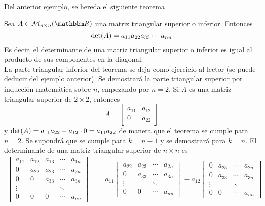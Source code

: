 Del anterior ejemplo, se hereda el siguiente teorema
\begin{theorem}\label{determinante_triangular}
    Sea $A \in \mathcal{M}_{n \times n}(\RR)$ una matriz triangular superior o inferior. Entonces
    $$\operatorname{det}(A) = a_{11}a_{22}a_{33} \cdots a_{nn}$$
    Es decir, el determinante de una matriz triangular superior o inferior es igual al producto de sus componentes en la diagonal.\\
    \demostracion La parte triangular inferior del teorema se deja como ejercicio al lector (se puede deducir del ejemplo anterior). Se demostrará la parte triangular superior por inducción matemática sobre $n$, empezando por $n = 2$. Si $A$ es una matriz triangular superior de $2 \times 2$, entonces
    $$A = \begin{bmatrix}
        a_{11} & a_{12} \\
        0 & a_{22}
    \end{bmatrix}$$
    y $\operatorname{det}(A) = a_{11} a_{22} - a_{12} \cdot 0 = a_{11}a_{22}$ de manera que el teorema se cumple para $n = 2$. Se supondrá que se cumple para $k = n-1$ y se demostrará para $k = n$. El determinante de una matriz triangular superior de $n \times n$ es
    \begin{align*}
        \begin{vmatrix}
            a_{11} & a_{12} & a_{13} & \cdots & a_{1n} \\
            0 & a_{22} & a_{23} & \cdots & a_{2n} \\
            0 & 0 & a_{33} & \cdots & a_{3n} \\
            \vdots & & & \ddots & \\
            0 & 0 & 0 & \cdots & a_{nn}
        \end{vmatrix} & = a_{11} \begin{vmatrix}
            a_{22} & a_{23} & \cdots & a_{2n} \\
            0 & a_{33} & \cdots & a_{3n} \\
            \vdots & & \ddots & \\
            0 & 0 & \cdots & a_{nn}
        \end{vmatrix} - a_{12} \begin{vmatrix}
            0 & a_{23} & \cdots & a_{2n} \\
            0 & a_{33} & \cdots & a_{3n} \\
            \vdots & & \ddots & \\
            0 & 0 & \cdots & a_{nn}
        \end{vmatrix} \\

\end{align*}
\end{theorem}

